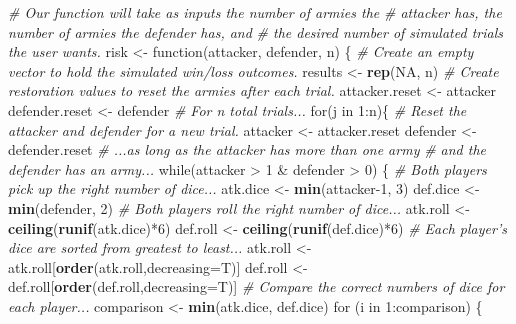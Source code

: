 \documentclass[]{book}
\newenvironment{Shaded}{\begin{snugshade}}{\end{snugshade}}
\newcommand{\KeywordTok}[1]{\textcolor[rgb]{0.13,0.29,0.53}{\textbf{{#1}}}}
\newcommand{\DataTypeTok}[1]{\textcolor[rgb]{0.13,0.29,0.53}{{#1}}}
\newcommand{\DecValTok}[1]{\textcolor[rgb]{0.00,0.00,0.81}{{#1}}}
\newcommand{\StringTok}[1]{\textcolor[rgb]{0.31,0.60,0.02}{{#1}}}
\newcommand{\CommentTok}[1]{\textcolor[rgb]{0.56,0.35,0.01}{\textit{{#1}}}}
\newcommand{\OtherTok}[1]{\textcolor[rgb]{0.56,0.35,0.01}{{#1}}}
\newcommand{\NormalTok}[1]{{#1}}
\begin{document}
\begin{Shaded}
\begin{Highlighting}[]
\CommentTok{# Our function will take as inputs the number of armies the }
\CommentTok{# attacker has, the number of armies the defender has, and }
\CommentTok{# the desired number of simulated trials the user wants.}
\NormalTok{risk <-}\StringTok{ }\NormalTok{function(attacker, defender, n) \{}
  \CommentTok{# Create an empty vector to hold the simulated win/loss outcomes.}
  \NormalTok{results <-}\StringTok{ }\KeywordTok{rep}\NormalTok{(}\OtherTok{NA}\NormalTok{, n)}
  \CommentTok{# Create restoration values to reset the armies after each trial.}
  \NormalTok{attacker.reset <-}\StringTok{ }\NormalTok{attacker}
  \NormalTok{defender.reset <-}\StringTok{ }\NormalTok{defender}
  \CommentTok{# For n total trials... }
  \NormalTok{for(j in }\DecValTok{1}\NormalTok{:n)\{}
    \CommentTok{# Reset the attacker and defender for a new trial.}
    \NormalTok{attacker <-}\StringTok{ }\NormalTok{attacker.reset}
    \NormalTok{defender <-}\StringTok{ }\NormalTok{defender.reset}
    \CommentTok{# ...as long as the attacker has more than one army}
    \CommentTok{# and the defender has an army...}
    \NormalTok{while(attacker >}\StringTok{ }\DecValTok{1} \NormalTok{&}\StringTok{ }\NormalTok{defender >}\StringTok{ }\DecValTok{0}\NormalTok{) \{}
      \CommentTok{# Both players pick up the right number of dice...}
      \NormalTok{atk.dice <-}\StringTok{ }\KeywordTok{min}\NormalTok{(attacker}\DecValTok{-1}\NormalTok{, }\DecValTok{3}\NormalTok{)}
      \NormalTok{def.dice <-}\StringTok{ }\KeywordTok{min}\NormalTok{(defender, }\DecValTok{2}\NormalTok{)}
      \CommentTok{# Both players roll the right number of dice...}
      \NormalTok{atk.roll <-}\StringTok{ }\KeywordTok{ceiling}\NormalTok{(}\KeywordTok{runif}\NormalTok{(atk.dice)*}\DecValTok{6}\NormalTok{)}
      \NormalTok{def.roll <-}\StringTok{ }\KeywordTok{ceiling}\NormalTok{(}\KeywordTok{runif}\NormalTok{(def.dice)*}\DecValTok{6}\NormalTok{)}
      \CommentTok{# Each player's dice are sorted from greatest to least...}
      \NormalTok{atk.roll <-}\StringTok{ }\NormalTok{atk.roll[}\KeywordTok{order}\NormalTok{(atk.roll,}\DataTypeTok{decreasing=}\NormalTok{T)]}
      \NormalTok{def.roll <-}\StringTok{ }\NormalTok{def.roll[}\KeywordTok{order}\NormalTok{(def.roll,}\DataTypeTok{decreasing=}\NormalTok{T)]}
      \CommentTok{# Compare the correct numbers of dice for each player...}
      \NormalTok{comparison <-}\StringTok{ }\KeywordTok{min}\NormalTok{(atk.dice, def.dice)}
      \NormalTok{for (i in }\DecValTok{1}\NormalTok{:comparison) \{}

\end{Highlighting}
\end{Shaded}
\end{document}
